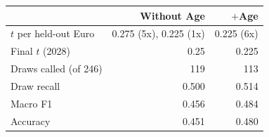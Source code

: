 
\begin{tabular}{lrr}
\toprule
 & Without Age & $+$Age\\
\midrule
$t$ per held-out Euro & 0.275 (5x), 0.225 (1x) & 0.225 (6x)\\
Final $t$ (2028) & 0.25 & 0.225\\
Draws called (of 246) & 119 & 113\\
Draw recall & 0.500 & 0.514\\
Macro F1 & 0.456 & 0.484\\
Accuracy & 0.451 & 0.480\\
\bottomrule
\end{tabular}
